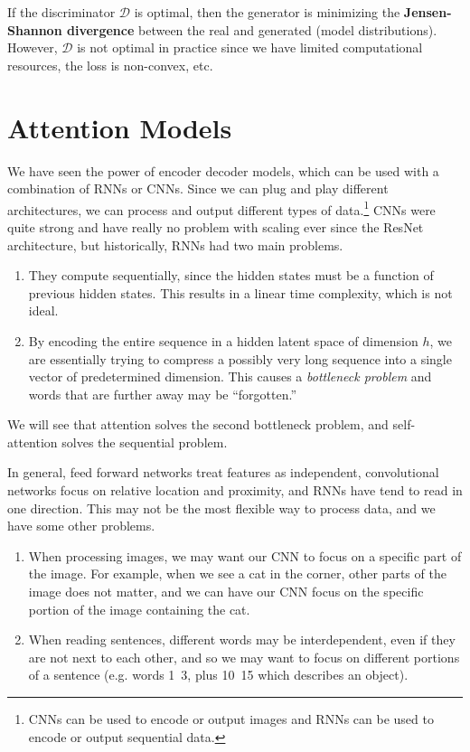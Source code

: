 \documentclass{article}
\begin{document}
  If the discriminator $\mathcal{D}$ is optimal, then the generator is minimizing the \textbf{Jensen-Shannon divergence} between the real and generated (model distributions). However, $\mathcal{D}$ is not optimal in practice since we have limited computational resources, the loss is non-convex, etc. 

\section{Attention Models}

    We have seen the power of encoder decoder models, which can be used with a combination of RNNs or CNNs. Since we can plug and play different architectures, we can process and output different types of data.\footnote{CNNs can be used to encode or output images and RNNs can be used to encode or output sequential data.} CNNs were quite strong and have really no problem with scaling ever since the ResNet architecture, but historically, RNNs had two main problems. 
    \begin{enumerate} 
      \item They compute sequentially, since the hidden states must be a function of previous hidden states. This results in a linear time complexity, which is not ideal. 
      \item By encoding the entire sequence in a hidden latent space of dimension $h$, we are essentially trying to compress a possibly very long sequence into a single vector of predetermined dimension. This causes a \textit{bottleneck problem} and words that are further away may be ``forgotten.''
    \end{enumerate}

    We will see that attention solves the second bottleneck problem, and self-attention solves the sequential problem. 

    In general, feed forward networks treat features as independent, convolutional networks focus on relative location and proximity, and RNNs have tend to read in one direction. This may not be the most flexible way to process data, and we have some other problems. 
    \begin{enumerate}
        \item When processing images, we may want our CNN to focus on a specific part of the image. For example, when we see a cat in the corner, other parts of the image does not matter, and we can have our CNN focus on the specific portion of the image containing the cat. 
        \item When reading sentences, different words may be interdependent, even if they are not next to each other, and so we may want to focus on different portions of a sentence (e.g. words 1~3, plus 10~15 which describes an object). 
    \end{enumerate}
\end{document}
